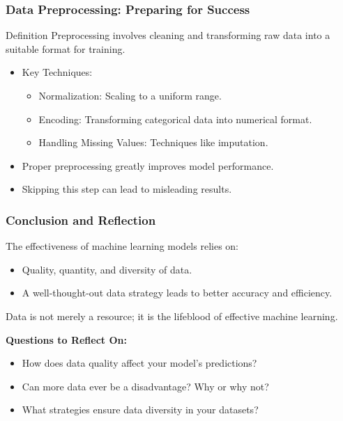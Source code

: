 \documentclass[aspectratio=169]{beamer}
\begin{document}
\begin{frame}[fragile]
    \frametitle{Data Preprocessing: Preparing for Success}
    \begin{block}{Definition}
        Preprocessing involves cleaning and transforming raw data into a suitable format for training.
    \end{block}
    \begin{itemize}
        \item Key Techniques:
        \begin{itemize}
            \item Normalization: Scaling to a uniform range.
            \item Encoding: Transforming categorical data into numerical format.
            \item Handling Missing Values: Techniques like imputation.
        \end{itemize}
        \item Proper preprocessing greatly improves model performance.
        \item Skipping this step can lead to misleading results.
    \end{itemize}
\end{frame}

\begin{frame}[fragile]
    \frametitle{Conclusion and Reflection}
    The effectiveness of machine learning models relies on:
    \begin{itemize}
        \item Quality, quantity, and diversity of data.
        \item A well-thought-out data strategy leads to better accuracy and efficiency.
    \end{itemize}
    \begin{example}
        Data is not merely a resource; it is the lifeblood of effective machine learning.
    \end{example}
    
    \textbf{Questions to Reflect On:}
    \begin{itemize}
        \item How does data quality affect your model's predictions?
        \item Can more data ever be a disadvantage? Why or why not?
        \item What strategies ensure data diversity in your datasets?
    \end{itemize}
\end{frame}
\end{document}
